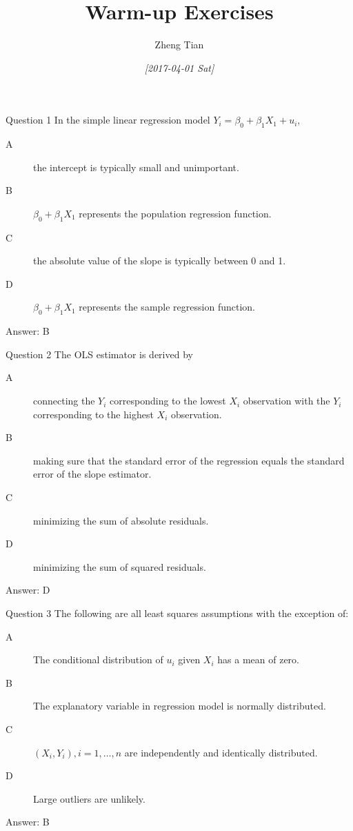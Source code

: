 \documentclass[presentation,10pt]{beamer}
\author{Zheng Tian}
\date{\textit{[2017-04-01 Sat]}}
\title{Warm-up Exercises}
\begin{document}
\maketitle


\begin{frame}[label={sec:org34239a5}]{Question 1}
In the simple linear regression model \(Y_{i} = \beta_0 + \beta_1 X_1 + u_i\),

\begin{description}
\item[{A}] the intercept is typically small and unimportant.
\item[{B}] \(\beta_0 + \beta_1 X_1\) represents the population regression function.
\item[{C}] the absolute value of the slope is typically between 0 and 1.
\item[{D}] \(\beta_0 + \beta_1 X_1\) represents the sample regression function.
\end{description}

\pause
\alert{Answer: B}
\pause
\end{frame}

\begin{frame}[label={sec:orgd495f21}]{Question 2}
The OLS estimator is derived by

\begin{description}
\item[{A}] connecting the \(Y_i\) corresponding to the lowest \(X_i\) observation with the \(Y_i\) corresponding to the highest \(X_i\) observation.
\item[{B}] making sure that the standard error of the regression equals the standard error of the slope estimator.
\item[{C}] minimizing the sum of absolute residuals.
\item[{D}] minimizing the sum of squared residuals.
\end{description}

\pause
\alert{Answer: D}
\pause
\end{frame}

\begin{frame}[label={sec:org2e18989}]{Question 3}
The following are all least squares assumptions with the exception of:

\begin{description}
\item[{A}] The conditional distribution of \(u_i\) given \(X_i\) has a mean of zero.
\item[{B}] The explanatory variable in regression model is normally distributed.
\item[{C}] \((X_i, Y_i), i=1, \ldots, n\) are independently and identically distributed.
\item[{D}] Large outliers are unlikely.
\end{description}

\pause
\alert{Answer: B}
\end{frame}
\end{document}
